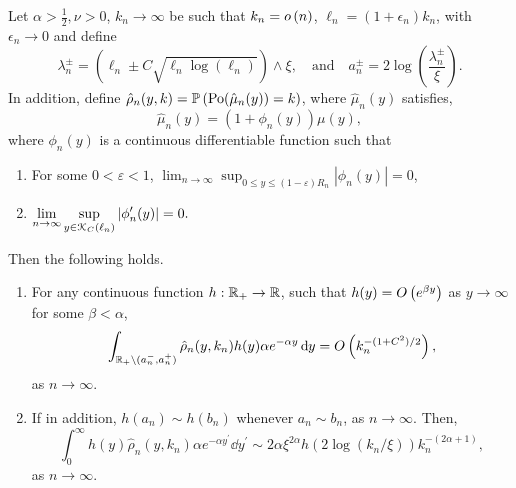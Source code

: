 \begin{lemma}\label{lem:concentration_argument_rho_approximation}
Let $\alpha > \frac{1}{2}, \nu > 0$, $k_n \to \infty$ be such that $k_n = o\left(n\right)$, $\ell_n = (1 + \epsilon_n)k_n$, with $\epsilon_n \to 0$ and define
\[
	\lambda_n^\pm = (\ell_n \pm C \sqrt{\ell_n \log(\ell_n)}) \wedge \xi, \quad \text{and} \quad a_n^\pm = 2 \log\left(\frac{\lambda_n^\pm}{\xi}\right).
\] 
In addition, define $\hat{\rho}_n(y,k) = \mathbb{P}\left({\mathrm{Po}}(\hat{\mu}_n(y)) = k\right)$, where $\hat{\mu}_n(y)$ satisfies, 
\[
	\hat{\mu}_n(y) = (1 + \phi_n(y))\mu(y),
\]
where $\phi_n(y)$ is a continuous differentiable function such that
\begin{enumerate}[\upshape i)]
\item For some $0 < \varepsilon < 1$, $\displaystyle \lim_{n \to \infty} \sup_{0 \le y \le (1 - \varepsilon)R_n} |\phi_n(y)| = 0$,
\item $\displaystyle \lim_{n \to \infty}  \sup_{y \in {\mathcal K}_{C}(\ell_n)} |\phi_n^\prime(y)| = 0.$
\end{enumerate}
Then the following holds.
\begin{enumerate}
\item For any continuous function $h : {\mathbb R}_+ \rightarrow  {\ensuremath{\mathbb R}}$, such that $h(y) = O\left(e^{\beta y}\right)$ as $y \to \infty$ for some $\beta < \alpha$, 
\begin{equation}\label{eq:error_bound_int_rho_approx_not_K}
	\int_{{\mathbb R}_+ \setminus (a_n^-, a_n^+)} \hat{\rho}_n(y,k_n) h(y) \alpha e^{-\alpha y} \operatorname{\mathrm{d}\hspace{-2pt}} y
	= O\left(k_n^{-(1+C^2)/2}\right),
\end{equation}
as $n \to \infty$.
\item If in addition, $h(a_n) \sim h(b_n)$ whenever $a_n \sim b_n$, as $n \to \infty$. Then,
\begin{equation}\label{eq:concentration_h_rho_approx}
	\int_0^\infty h(y) \hat{\rho}_n(y,k_n) \alpha e^{-\alpha y^\prime} \dd y^\prime \sim  
		2\alpha \xi^{2\alpha} h(2\log(k_n/\xi)) k_n^{-(2\alpha + 1)},
\end{equation}
as $n \to \infty$.
\end{enumerate}
\end{lemma}

